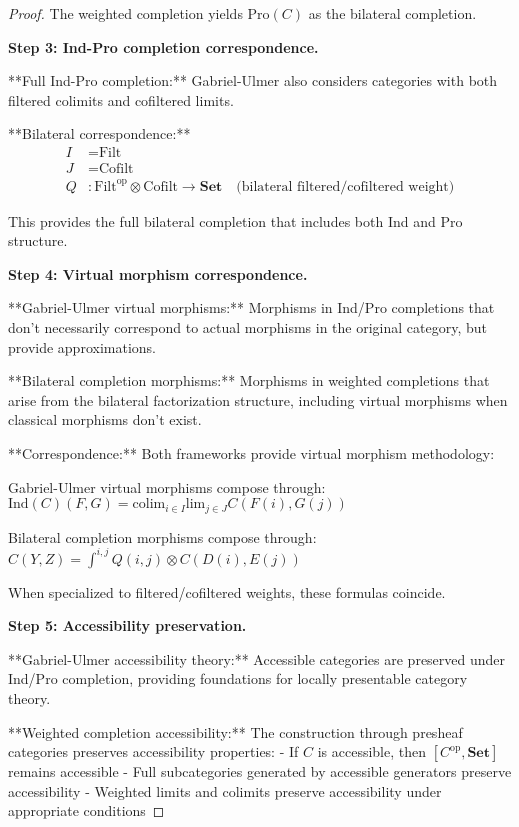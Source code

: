 \documentclass[11pt]{article}
\theoremstyle{plain}
\theoremstyle{definition}
\theoremstyle{remark}
\newcommand{\op}{\mathrm{op}}
\newcommand{\colim}{\mathrm{colim}}
\renewcommand{\lim}{\mathrm{lim}}
\newcommand{\wh}[1]{\widehat{#1}}
\begin{document}
\begin{proof}
The weighted completion yields $\text{Pro}(C)$ as the bilateral completion.

\textbf{Step 3: Ind-Pro completion correspondence.}

**Full Ind-Pro completion:** Gabriel-Ulmer also considers categories with both filtered colimits and cofiltered limits.

**Bilateral correspondence:**
\begin{align}
I &= \text{Filt} \\
J &= \text{Cofilt} \\
Q &: \text{Filt}^{\op} \otimes \text{Cofilt} \to \mathbf{Set} \quad \text{(bilateral filtered/cofiltered weight)}
\end{align}

This provides the full bilateral completion that includes both Ind and Pro structure.

\textbf{Step 4: Virtual morphism correspondence.}

**Gabriel-Ulmer virtual morphisms:** Morphisms in Ind/Pro completions that don't necessarily correspond to actual morphisms in the original category, but provide approximations.

**Bilateral completion morphisms:** Morphisms in weighted completions that arise from the bilateral factorization structure, including virtual morphisms when classical morphisms don't exist.

**Correspondence:** Both frameworks provide virtual morphism methodology:

Gabriel-Ulmer virtual morphisms compose through:
$\text{Ind}(C)(F, G) = \colim_{i \in I} \lim_{j \in J} C(F(i), G(j))$

Bilateral completion morphisms compose through:
$\wh{C}(Y, Z) = \int^{i,j} Q(i,j) \otimes C(D(i), E(j))$

When specialized to filtered/cofiltered weights, these formulas coincide.

\textbf{Step 5: Accessibility preservation.}

**Gabriel-Ulmer accessibility theory:** Accessible categories are preserved under Ind/Pro completion, providing foundations for locally presentable category theory.

**Weighted completion accessibility:** The construction through presheaf categories preserves accessibility properties:
- If $C$ is accessible, then $[C^{\op}, \mathbf{Set}]$ remains accessible
- Full subcategories generated by accessible generators preserve accessibility
- Weighted limits and colimits preserve accessibility under appropriate conditions


\end{proof}
\end{document}
